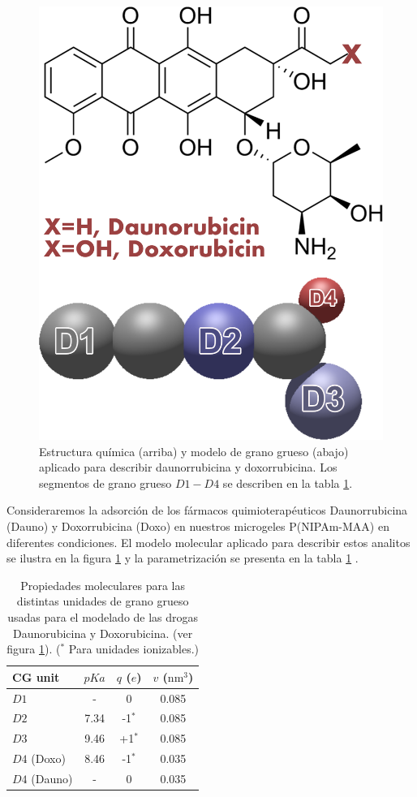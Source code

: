 \begin{figure}[!tb]
\centering
\includegraphics[width=0.35\linewidth]{Figures/graph-gel/dauno-doxo.png}
\caption{Estructura qu\'imica (arriba) y modelo de grano grueso (abajo) aplicado para describir daunorrubicina y doxorrubicina.
	Los segmentos de grano grueso $D1-D4$ se describen en la tabla \ref{table:gel:drugs}.}
\label{fig:gel:dauno-doxo}
\end{figure}


Consideraremos la adsorci\'on de los f\'armacos quimioterap\'euticos Daunorrubicina (Dauno) y Doxorrubicina (Doxo) en nuestros microgeles P(NIPAm-MAA) en diferentes condiciones.
El modelo molecular aplicado para describir estos analitos se ilustra en la figura \ref{fig:gel:dauno-doxo} y la parametrizaci\'on se presenta en la tabla \ref{table:gel:drugs} \cite{PerezChavez2020}.

\begin{table}
\centering
\begin{tabular}{|lccc|}
    \hline
    {CG unit} & {$pKa$} & {$q$ ($e$)} & {$v$ ($\text{nm}^3$)} \\
      \hline
$D1$ & - & 0 & 0.085\\
$D2$ & 7.34 & -1$^\ast$ & 0.085\\
$D3$ & 9.46 & +1$^\ast$ & 0.085\\ 
$D4$ (Doxo) & 8.46 & -1$^\ast$ & 0.035\\
$D4$ (Dauno) & - & 0 & 0.035 \\
    \hline
  \end{tabular}
 \caption{Propiedades moleculares para las distintas unidades de grano grueso usadas para el modelado de las drogas Daunorubicina y Doxorubicina. (ver figura \ref{fig:gel:dauno-doxo}).
\footnotesize ($^\ast$ Para unidades ionizables.)}
\label{table:gel:drugs} 
\end{table}




